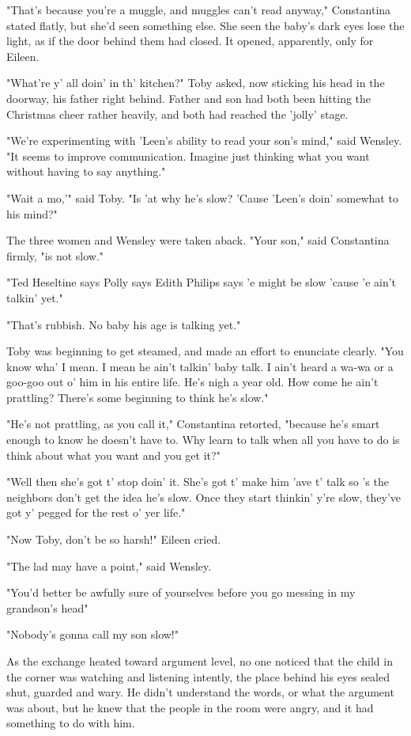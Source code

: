 "That's because you're a muggle, and muggles can't read anyway," Constantina stated flatly, but she'd seen something else. She seen the baby's dark eyes lose the light, as if the door behind them had closed. It opened, apparently, only for Eileen.

"What're y' all doin' in th' kitchen?" Toby asked, now sticking his head in the doorway, his father right behind. Father and son had both been hitting the Christmas cheer rather heavily, and both had reached the 'jolly' stage.

"We're experimenting with 'Leen's ability to read your son's mind," said Wensley. "It seems to improve communication. Imagine just thinking what you want without having to say anything."

"Wait a mo,'" said Toby. "Is 'at why he's slow? 'Cause 'Leen's doin' somewhat to his mind?"

The three women and Wensley were taken aback. "Your son," said Constantina firmly, "is not slow."

"Ted Heseltine says Polly says Edith Philips says 'e might be slow 'cause 'e ain't talkin' yet."

"That's rubbish. No baby his age is talking yet."

Toby was beginning to get steamed, and made an effort to enunciate clearly. "You know wha' I mean. I mean he ain't talkin' baby talk. I ain't heard a wa-wa or a goo-goo out o' him in his entire life. He's nigh a year old. How come he ain't prattling? There's some beginning to think he's slow."

"He's not prattling, as you call it," Constantina retorted, "because he's smart enough to know he doesn't have to. Why learn to talk when all you have to do is think about what you want and you get it?"

"Well then she's got t' stop doin' it. She's got t' make him 'ave t' talk so 's the neighbors don't get the idea he's slow. Once they start thinkin' y're slow, they've got y' pegged for the rest o' yer life."

"Now Toby, don't be so harsh!" Eileen cried.

"The lad may have a point," said Wensley.

"You'd better be awfully sure of yourselves before you go messing in my grandson's head{\el}"

"Nobody's gonna call my son slow!"

As the exchange heated toward argument level, no one noticed that the child in the corner was watching and listening intently, the place behind his eyes sealed shut, guarded and wary. He didn't understand the words, or what the argument was about, but he knew that the people in the room were angry, and it had something to do with him.

